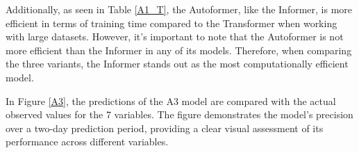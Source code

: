 Additionally, as seen in Table \ref{A1_T}, the Autoformer, like the Informer, is more efficient in terms of training time compared to the Transformer when working with large datasets. However, it's important to note that the Autoformer is not more efficient than the Informer in any of its models. Therefore, when comparing the three variants, the Informer stands out as the most computationally efficient model.

In Figure \ref{A3}, the predictions of the A3 model are compared with the actual observed values for the 7 variables. The figure demonstrates the model's precision over a two-day prediction period, providing a clear visual assessment of its performance across different variables.

\begin{table}[]
    \centering
\end{table}
